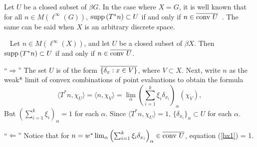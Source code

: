 Let $U$ be a closed subset of $\beta G$.
In the case where $X=G$, it is well known that for all $n\in M(\ell^\infty(G))$,
$\operatorname{supp\,}(T^*n) \subset U$ if and only if $n\in \overline{\operatorname{conv\,} U}$~\cite{wilde}.
The same can be said when $X$ is an arbitrary discrete space.

\begin{proposition}~\label{w&w}
Let $n\in M(\ell^\infty(X))$, and let $U$ be a closed subset of $\beta X$.
Then $\operatorname{supp\,}(T^*n) \subset U$ if and only if $n\in\overline{\operatorname{conv\,} U}$.
\end{proposition}
\proof
``$\Rightarrow$''  The set $U$ is of the form $\overline{\{\delta_x: x\in V\}}$, where $V\subset X$.
Next, write $n$ as the weak* limit of convex combinations of point evaluations to obtain the formula
\begin{equation}\label{bx1}
\langle T^*n, \chi_U\rangle = \langle n, \chi_V \rangle =
\lim_\alpha\left(\sum_{i=1}^k \xi_i \delta_{x_i}\right)_\alpha(\chi_V),
\end{equation}
But $(\sum_{i=1}^k \xi_i)_\alpha = 1$ for each $\alpha$.  Since $\langle T^*n, \chi_U\rangle = 1$,
$\{\delta_{x_i}\}_\alpha \subset U$ for each $\alpha$.

``$\Leftarrow$''  Notice that for $n = w^*\lim_\alpha\left(\sum_{i=1}^k \xi_i \delta_{x_i}\right)_\alpha \in\overline{\operatorname{conv\,} U}$,
equation (\ref{bx1}) = 1.
\done

